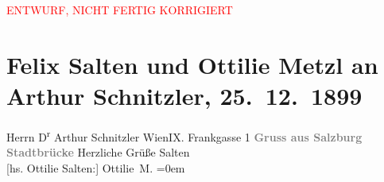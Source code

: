 
\begin{center}
            \textcolor{red}{ENTWURF, NICHT FERTIG KORRIGIERT}
                      \end{center}
            
         \renewcommand{\erwaehnteOrte}{Orte: Frankgasse, IX., Alsergrund, Salzburg, Staatsbrücke, Wien}
         \renewcommand{\erwaehnteWerke}{}
               \section[Felix Salten und Ottilie Metzl an Arthur Schnitzler, 25. 12. 1899]{ Felix Salten und Ottilie Metzl an Arthur Schnitzler,
               25. 12. 1899}\nopagebreak{}\rehead{ }\begin{ledgroupsized}[t]{13cm}\normalsize\beginnumbering \toendnotes[C]{\smallbreak\pagebreak[2]} 
\pstart{}{\pb}Herrn D\textsuperscript{r} Arthur Schnitzler \pend{}\pstart{}Wien\pend{}\pstart{}IX. Frankgasse 1\pend{}{\bigskip}\pstart
           \noindent{}\centering{}{\pb}\textcolor{gray}{\textbf{Gruss aus Salzburg}}\pend
           \pstart
           \noindent{}\centering{}\textcolor{gray}{\textbf{Stadtbrücke}}\pend
           \pstart
           Herzliche Grüße\pend
           \pstart
           \spacefill\mbox{Salten }{\\[\baselineskip]}{[}hs. Ottilie Salten:{]} \spacefill\mbox{Ottilie M.}\pend
           \leftskip=0em{}
         
         \endnumbering{}\end{ledgroupsized}\begin{anhang}\end{anhang}\newcommand{\dateiname}{L03303}\newcommand{\titel}{Felix Salten und Ottilie Metzl an Arthur Schnitzler, 25. 12. 1899}\newcommand{\editorInnen}{Martin Anton Müller und Laura Untner}
      